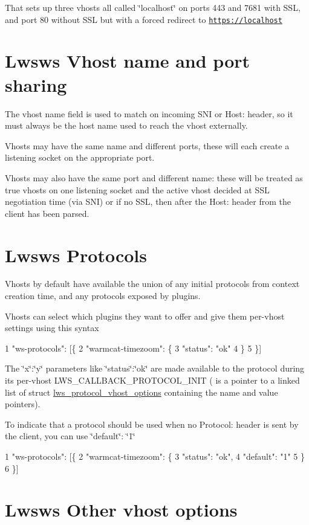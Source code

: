 That sets up three vhosts all called \char`\"{}localhost\char`\"{} on ports 443 and 7681 with S\+SL, and port 80 without S\+SL but with a forced redirect to \href{https://localhost}{\tt https\+://localhost}\hypertarget{md_README.lwsws_lwswsvn}{}\section{Lwsws Vhost name and port sharing}\label{md_README.lwsws_lwswsvn}
The vhost name field is used to match on incoming S\+NI or Host\+: header, so it must always be the host name used to reach the vhost externally.


\begin{DoxyItemize}
\item Vhosts may have the same name and different ports, these will each create a listening socket on the appropriate port.
\item Vhosts may also have the same port and different name\+: these will be treated as true vhosts on one listening socket and the active vhost decided at S\+SL negotiation time (via S\+NI) or if no S\+SL, then after the Host\+: header from the client has been parsed.
\end{DoxyItemize}\hypertarget{md_README.lwsws_lwswspr}{}\section{Lwsws Protocols}\label{md_README.lwsws_lwswspr}
Vhosts by default have available the union of any initial protocols from context creation time, and any protocols exposed by plugins.

Vhosts can select which plugins they want to offer and give them per-\/vhost settings using this syntax 
\begin{DoxyCode}
1 "ws-protocols": [\{
2   "warmcat-timezoom": \{
3     "status": "ok"
4   \}
5 \}]
\end{DoxyCode}


The \char`\"{}x\char`\"{}\+:\char`\"{}y\char`\"{} parameters like \char`\"{}status\char`\"{}\+:\char`\"{}ok\char`\"{} are made available to the protocol during its per-\/vhost L\+W\+S\+\_\+\+C\+A\+L\+L\+B\+A\+C\+K\+\_\+\+P\+R\+O\+T\+O\+C\+O\+L\+\_\+\+I\+N\+IT ( is a pointer to a linked list of struct \hyperlink{structlws__protocol__vhost__options}{lws\+\_\+protocol\+\_\+vhost\+\_\+options} containing the name and value pointers).

To indicate that a protocol should be used when no Protocol\+: header is sent by the client, you can use \char`\"{}default\char`\"{}\+: \char`\"{}1\char`\"{} 
\begin{DoxyCode}
1 "ws-protocols": [\{
2   "warmcat-timezoom": \{
3     "status": "ok",
4     "default": "1"
5   \}
6 \}]
\end{DoxyCode}
\hypertarget{md_README.lwsws_lwswsovo}{}\section{Lwsws Other vhost options}\label{md_README.lwsws_lwswsovo}

